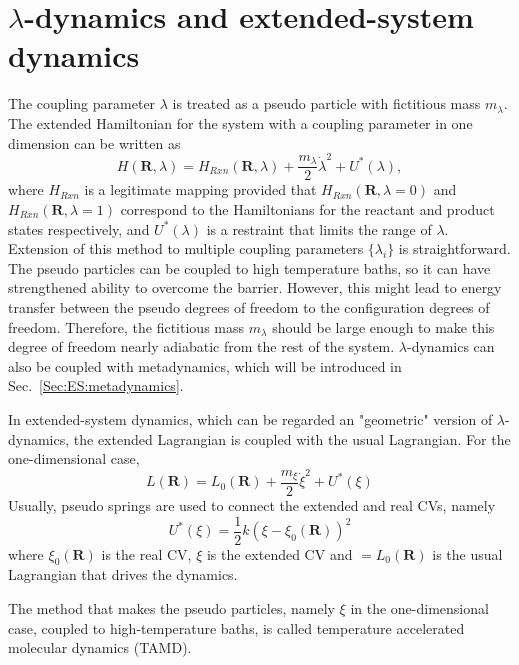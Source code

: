 \section{\texorpdfstring{$\lambda$-dynamics and extended-system dynamics}{λ-dynamics}\label{Sec:ES:lambdadynamics}}
The coupling parameter $\lambda$ is treated as a pseudo particle with fictitious mass $m_\lambda$.
The extended Hamiltonian for the system with a coupling parameter in one dimension can be written as
\begin{equation}
	H(\mathbf{R},\lambda)=H_{Rxn}(\mathbf{R},\lambda) + \frac{m_\lambda}{2}{\dot{\lambda}}^2+U^{*}(\lambda),
\end{equation}
where $H_{Rxn}$ is a legitimate mapping provided that $H_{Rxn}(\mathbf{R},\lambda=0)$ and $H_{Rxn}(\mathbf{R},\lambda=1)$ correspond to the Hamiltonians for the reactant and product states respectively, and $U^{*}(\lambda)$ is a restraint that limits the range of $\lambda$. Extension of this method to multiple coupling parameters $\{\lambda_i\}$ is straightforward. The pseudo particles can be coupled to high temperature baths, so it can have strengthened ability to overcome the barrier. However, this might lead to energy transfer between the pseudo degrees of freedom to the configuration degrees of freedom. Therefore, the fictitious mass $m_\lambda$ should be large enough to make this degree of freedom nearly adiabatic from the rest of the system.\cite{AbramsJCP2006} $\lambda$-dynamics can also be coupled with metadynamics,\cite{WuJPCL2011} which will be introduced in Sec.~\ref{Sec:ES:metadynamics}.

In extended-system dynamics, which can be regarded an "geometric" version of $\lambda$-dynamics, the extended Lagrangian is coupled with the usual Lagrangian. For the one-dimensional case,
\begin{equation}
	L(\mathbf{R})=L_{0}(\mathbf{R}) + \frac{m_\xi}{2}{\dot{\xi}}^2+U^{*}(\xi)
\end{equation}
Usually, pseudo springs are used to connect the extended and real CVs, namely
\begin{equation}
	U^{*}(\xi)=\frac{1}{2}k(\xi-\xi_{0}(\mathbf{R}))^{2}
\end{equation}
where $\xi_{0}(\mathbf{R})$ is the real CV, $\xi$ is the extended CV and $=L_{0}(\mathbf{R})$ is the usual Lagrangian that drives the dynamics.

The method that makes the pseudo particles, namely $\xi$ in the one-dimensional case, coupled to high-temperature baths, is called temperature accelerated molecular dynamics (TAMD).\cite{MaraglianoCPL2006} 

